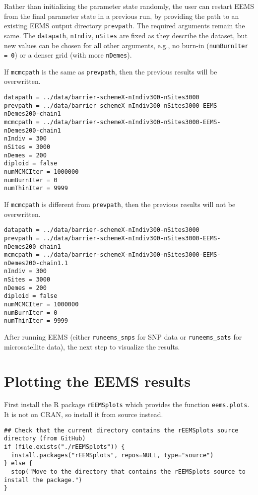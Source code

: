 \documentclass[a4paper,10pt,DIV=15,titlepage,mpinclude=true]{scrartcl}
\newcommand{\keystring}[1]{{\tt #1}}
\begin{document}
Rather than initializing the parameter state randomly, the user can restart EEMS from the final parameter state in a previous run, by providing the path to an existing EEMS output directory \keystring{prevpath}. The required arguments remain the same. The \keystring{datapath}, \keystring{nIndiv}, \keystring{nSites} are fixed as they describe the dataset, but new values can be chosen for all other arguments, e.g., no burn-in (\keystring{numBurnIter = 0}) or a denser grid (with more \keystring{nDemes}).

If \keystring{mcmcpath} is the same as \keystring{prevpath}, then the previous results will be overwritten.

\begin{lstlisting}[style=Cppcode]
datapath = ../data/barrier-schemeX-nIndiv300-nSites3000
prevpath = ../data/barrier-schemeX-nIndiv300-nSites3000-EEMS-nDemes200-chain1
mcmcpath = ../data/barrier-schemeX-nIndiv300-nSites3000-EEMS-nDemes200-chain1
nIndiv = 300
nSites = 3000
nDemes = 200
diploid = false
numMCMCIter = 1000000
numBurnIter = 0
numThinIter = 9999
\end{lstlisting}

If \keystring{mcmcpath} is different from \keystring{prevpath}, then the previous results will not be overwritten.

\begin{lstlisting}[style=Cppcode]
datapath = ../data/barrier-schemeX-nIndiv300-nSites3000
prevpath = ../data/barrier-schemeX-nIndiv300-nSites3000-EEMS-nDemes200-chain1
mcmcpath = ../data/barrier-schemeX-nIndiv300-nSites3000-EEMS-nDemes200-chain1.1
nIndiv = 300
nSites = 3000
nDemes = 200
diploid = false
numMCMCIter = 1000000
numBurnIter = 0
numThinIter = 9999
\end{lstlisting}

After running EEMS (either \keystring{runeems\_snps} for SNP data or \keystring{runeems\_sats} for microsatellite data), the next step to visualize the results.

\newpage

\section{Plotting the EEMS results}\label{sec:plotting-eems}

First install the R package \keystring{rEEMSplots} which provides the function \keystring{eems.plots}. It is not on CRAN, so install it from source instead.

\begin{lstlisting}[style=Rcode]
## Check that the current directory contains the rEEMSplots source directory (from GitHub)
if (file.exists("./rEEMSplots")) {
  install.packages("rEEMSplots", repos=NULL, type="source")
} else {
  stop("Move to the directory that contains the rEEMSplots source to install the package.")
}
\end{lstlisting}
\end{document}
